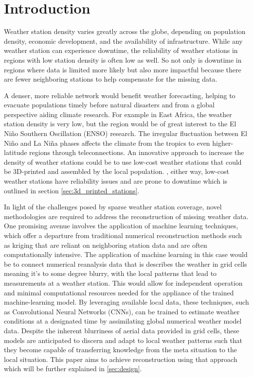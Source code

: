 \section{Introduction}
\label{sec:introduction}


Weather station density varies greatly across the globe, depending on population density, economic development, and the availability of infrastructure. \cite{ortizbobea2021} While any weather station can experience downtime, the reliability of weather stations in regions with low station density is often low as well. So not only is downtime in regions where data is limited more likely but also more impactful because there are fewer neighboring stations to help compensate for the missing data.

A denser, more reliable network would benefit weather forecasting, helping to evacuate populations timely before natural disasters and from a global perspective aiding climate research. For example in East Africa, the weather station density is very low, but the region would be of great interest to the El Niño Southern Oscillation (ENSO) research. The irregular fluctuation between El Niño and La Niña phases affects the climate from the tropics to even higher-latitude regions through teleconnections. \cite{marchant2007, muita2021}  An innovative approach to increase the density of weather stations could be to use low-cost weather stations that could be 3D-printed and assembled by the local population. \cite{muita2021}, either way, low-cost weather stations have reliability issues and are prone to downtime which is outlined in section \ref{sec:3d_printed_stations}.


In light of the challenges posed by sparse weather station coverage, novel methodologies are required to address the reconstruction of missing weather data. One promising avenue involves the application of machine learning techniques, which offer a departure from traditional numerical reconstruction methods such as kriging that are reliant on neighboring station data and are often computationally intensive. The application of machine learning in this case would be to connect numerical reanalysis data that is describes the weather in grid cells meaning it's to some degree blurry, with the local patterns that lead to measurements at a weather station. This would allow for independent operation and minimal computational resources needed for the appliance of the trained machine-learning model. By leveraging available local data, these techniques, such as Convolutional Neural Networks (CNNs), can be trained to estimate weather conditions at a designated time by assimilating global numerical weather model data. Despite the inherent blurriness of aerial data provided in grid cells, these models are anticipated to discern and adapt to local weather patterns such that they become capable of transferring knowledge from the meta situation to the local situation. This paper aims to achieve reconstruction using that approach which will be further explained in \autoref{sec:design}.

